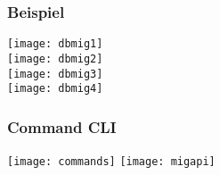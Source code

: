 \begin{multicols*}{2}
\subsubsection{Beispiel}
\vspace{2mm}
\texttt{[image: dbmig1]}\\
\vspace{2mm}
\texttt{[image: dbmig2]}\\
\vspace{2mm}
\texttt{[image: dbmig3]}\\
\vspace{2mm}
\texttt{[image: dbmig4]}\\
\subsubsection{Command CLI}
\texttt{[image: commands]}
\texttt{[image: migapi]}
\end{multicols*}